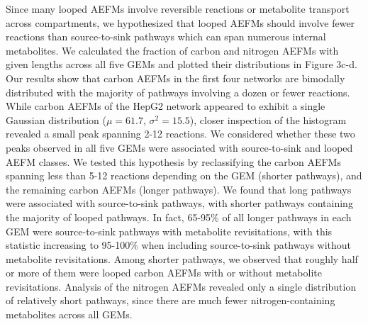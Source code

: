 \documentclass[12pt]{article}
\begin{document}
Since many looped AEFMs involve reversible reactions or metabolite
transport across compartments, we hypothesized that looped AEFMs should
involve fewer reactions than source-to-sink pathways which can span
numerous internal metabolites. We calculated the fraction of carbon and
nitrogen AEFMs with given lengths across all five GEMs and plotted their
distributions in Figure 3c-d. Our results show that carbon AEFMs in the
first four networks are bimodally distributed with the majority of
pathways involving a dozen or fewer reactions. While carbon AEFMs of the
HepG2 network appeared to exhibit a single Gaussian distribution
($\mu=61.7$, $\sigma^2=15.5$), closer inspection of the histogram revealed
a small peak spanning 2-12 reactions. We considered whether these two
peaks observed in all five GEMs were associated with source-to-sink and
looped AEFM classes. We tested this hypothesis by reclassifying the carbon
AEFMs spanning less than 5-12 reactions depending on the GEM (shorter
pathways), and the remaining carbon AEFMs (longer pathways). We found that
long pathways were associated with source-to-sink pathways, with shorter
pathways containing the majority of looped pathways. In fact, 65-95\% of
all longer pathways in each GEM were source-to-sink pathways with
metabolite revisitations, with this statistic increasing to 95-100\% when
including source-to-sink pathways without metabolite revisitations. Among
shorter pathways, we observed that roughly half or more of them were
looped carbon AEFMs with or without metabolite revisitations. Analysis of
the nitrogen AEFMs revealed only a single distribution of relatively short
pathways, since there are much fewer nitrogen-containing metabolites
across all GEMs.
\end{document}
